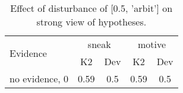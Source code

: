 \begin{table}\begin{tabular}{l|cc|cc}\toprule\multirow{2}{*}{Evidence} & \multicolumn{2}{c}{sneak}& \multicolumn{2}{c}{motive}\\& {K2} & {Dev}& {K2} & {Dev}\\\midrule
no evidence, 0 & \cellcolor{Bittersweet}0.59&\cellcolor{Bittersweet}0.5&\cellcolor{Bittersweet}0.59&\cellcolor{Bittersweet}0.5\\\bottomrule\end{tabular}\caption{Effect of disturbance of [0.5, 'arbit'] on strong view of hypotheses.}\end{table}